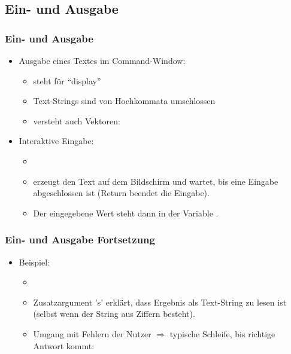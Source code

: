   \subsection{Ein- und Ausgabe}
  \begin{frame}
      \frametitle{Ein- und Ausgabe}
      \begin{itemize}
          \item Ausgabe eines Textes im Command-Window:
            \begin{itemize}
                \item {} steht für ``display''
                \item Text-Strings sind von Hochkommata umschlossen
                \item {} versteht auch Vektoren: 
            \end{itemize}
          \item Interaktive Eingabe:
          \begin{itemize}
              \item {} 
              \item erzeugt den Text auf dem Bildschirm und wartet, bis eine Eingabe abgeschlossen ist (Return beendet die Eingabe).
              \item Der eingegebene Wert steht dann in der Variable .
          \end{itemize}
      \end{itemize}
  \end{frame}

  \begin{frame}
      \frametitle{Ein- und Ausgabe Fortsetzung}
      \begin{itemize}
          \item Beispiel:
          \begin{itemize}
              \item {}
              \item Zusatzargument 's' erklärt, dass Ergebnis als Text-String zu lesen ist (selbst wenn der String aus Ziffern besteht).
              \item Umgang mit Fehlern der Nutzer $\Rightarrow$ typische Schleife, bis richtige Antwort kommt:
          \end{itemize}
          
      \end{itemize}
  \end{frame}


